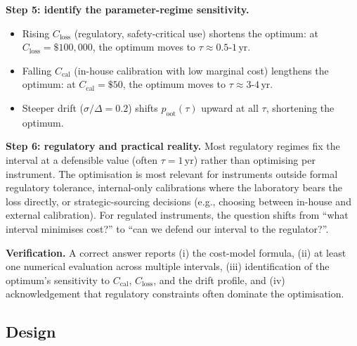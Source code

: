 \begin{exercise}
\textbf{Step 5: identify the parameter-regime sensitivity.}
\begin{itemize}
  \item Rising $C_{\text{loss}}$ (regulatory, safety-critical
  use) shortens the optimum: at $C_{\text{loss}} = \$100{,}000$,
  the optimum moves to $\tau \approx 0.5$-$1 \,\text{yr}$.
  \item Falling $C_{\text{cal}}$ (in-house calibration with low
  marginal cost) lengthens the optimum: at $C_{\text{cal}} =
  \$50$, the optimum moves to $\tau \approx 3$-$4 \,\text{yr}$.
  \item Steeper drift ($\sigma/\Delta = 0.2$) shifts $p_{\text{
  oot}}(\tau)$ upward at all $\tau$, shortening the optimum.
\end{itemize}

\textbf{Step 6: regulatory and practical reality.} Most regulatory
regimes fix the interval at a defensible value (often $\tau =
1 \,\text{yr}$) rather than optimising per instrument. The
optimisation is most relevant for instruments outside formal
regulatory tolerance, internal-only calibrations where the
laboratory bears the loss directly, or strategic-sourcing
decisions (e.g., choosing between in-house and external
calibration). For regulated instruments, the question shifts
from ``what interval minimises cost?'' to ``can we defend our
interval to the regulator?''.

\textbf{Verification.} A correct answer reports (i) the
cost-model formula, (ii) at least one numerical evaluation
across multiple intervals, (iii) identification of the optimum's
sensitivity to $C_{\text{cal}}$, $C_{\text{loss}}$, and the
drift profile, and (iv) acknowledgement that regulatory
constraints often dominate the optimisation.
\end{exercise}

\subsection*{Design}

